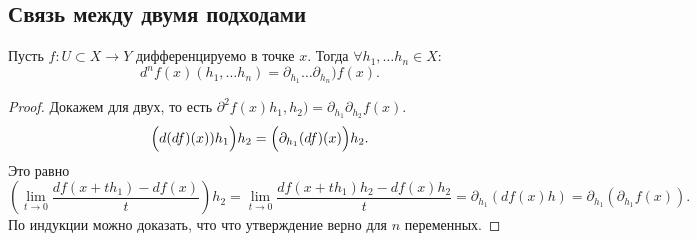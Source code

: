 \documentclass[11pt,dvipsnames]{report}
\begin{document}
\subsection{Связь между двумя подходами}
\begin{thm}
    Пусть $ f \colon U \subset X \to  Y$ дифференцируемо  в точке $ x$. 
    Тогда  $ \forall h_1, \ldots h_n \in X\colon $
    \[
	d^{n}f(x) (h_1, \ldots h_n) = \partial _{  h_1} \ldots \partial _{h_n})f(x)
    .\] 
\end{thm}
\begin{proof}
    Докажем для двух, то есть $ \partial ^2f(x) h_1, h_2) = \partial _{h_1} \partial _{h_2}f(x)$.
    \[
    \Bigl(	d(df)(x))h_1\Bigr) h_2 = \Bigl(\partial _{h_1} (df) (x) \Bigr)h_2
    .\] 
    Это равно
    \[
	\left(   \lim_{t \to  0}  \frac{df(x+ th_1) - df(x)}{t}\right) h_2 = \lim_{t \to  0} \frac{df(x+th_1)h_2 - df(x)h_2}{t} = \partial _{h_1}\left( df(x) h \right) = \partial _{h_1} \left( \partial _{h_1} f(x) \right) 
    .\] 
    По индукции можно доказать, что что утверждение верно для $ n$ переменных.
\end{proof}
\end{document}
